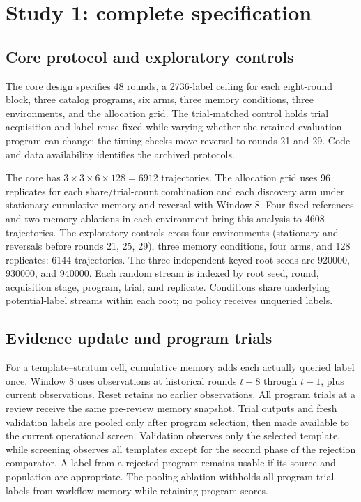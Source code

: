 \section{Study 1: complete specification}
\label{app:protocol}
\subsection{Core protocol and exploratory controls}
The core design specifies 48 rounds, a 2736-label ceiling for each eight-round block, three catalog programs, six arms, three memory conditions, three environments, and the allocation grid. The trial-matched control holds trial acquisition and label reuse fixed while varying whether the retained evaluation program can change; the timing checks move reversal to rounds 21 and 29. Code and data availability identifies the archived protocols.

The core has $3\times3\times6\times128=6912$ trajectories. The allocation grid uses 96 replicates for each share/trial-count combination and each discovery arm under stationary cumulative memory and reversal with Window 8. Four fixed references and two memory ablations in each environment bring this analysis to 4608 trajectories. The exploratory controls cross four environments (stationary and reversals before rounds 21, 25, 29), three memory conditions, four arms, and 128 replicates: 6144 trajectories. The three independent keyed root seeds are 920000, 930000, and 940000. Each random stream is indexed by root seed, round, acquisition stage, program, trial, and replicate. Conditions share underlying potential-label streams within each root; no policy receives unqueried labels.

\subsection{Evidence update and program trials}
For a template--stratum cell, cumulative memory adds each actually queried label once. Window 8 uses observations at historical rounds $t-8$ through $t-1$, plus current observations. Reset retains no earlier observations. All program trials at a review receive the same pre-review memory snapshot. Trial outputs and fresh validation labels are pooled only after program selection, then made available to the current operational screen. Validation observes only the selected template, while screening observes all templates except for the second phase of the rejection comparator. A label from a rejected program remains usable if its source and population are appropriate. The pooling ablation withholds all program-trial labels from workflow memory while retaining program scores.

